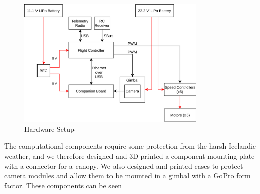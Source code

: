 \begin{figure}
    \centering
    \includegraphics[width=0.8\textwidth]{images/hardware.png}
    \caption{Hardware Setup}
    \label{fig:hardware_setup}
\end{figure}

The computational components require some protection from the harsh Icelandic weather,
and we therefore designed and 3D-printed a component mounting plate with a connector for a canopy.
We also designed and printed cases to protect camera modules and allow them to be mounted in a gimbal with a GoPro form factor.
These components can be seen

%
